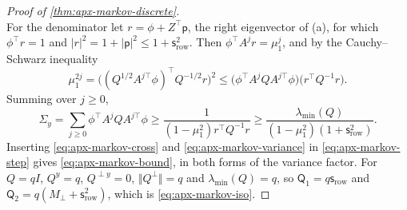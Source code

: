 \begin{proof}[Proof of \cref{thm:apx-markov-discrete}]
\begin{equation}
\end{equation}
For the denominator let $r=\phi+Z^\top\mathsf p$, the right eigenvector of (a), for which $\phi^\top r=1$ and $\lvert r\rvert^2=1+\lvert\mathsf p\rvert^2\le1+\mathsf s_{\mathrm{row}}^2$. Then $\phi^\top A^jr=\mu_1^j$, and by the Cauchy--Schwarz inequality
\begin{equation*}
\mu_1^{2j}=\bigl((Q^{1/2}A^{j\top}\phi)^\top Q^{-1/2}r\bigr)^2\le\bigl(\phi^\top A^jQA^{j\top}\phi\bigr)\bigl(r^\top Q^{-1}r\bigr).
\end{equation*}
Summing over $j\ge0$,
\begin{equation}\label{eq:apx-markov-variance}
\Sigma_y=\sum_{j\ge0}\phi^\top A^jQA^{j\top}\phi\ge\frac1{(1-\mu_1^2)r^\top Q^{-1}r}\ge\frac{\lambda_{\min}(Q)}{(1-\mu_1^2)(1+\mathsf s_{\mathrm{row}}^2)} .
\end{equation}
Inserting \eqref{eq:apx-markov-cross} and \eqref{eq:apx-markov-variance} in \eqref{eq:apx-markov-step} gives \eqref{eq:apx-markov-bound}, in both forms of the variance factor. For $Q=qI$, $Q^y=q$, $Q^{\perp y}=0$, $\Vert Q^\perp\Vert=q$ and $\lambda_{\min}(Q)=q$, so $\mathsf Q_1=q\mathsf s_{\mathrm{row}}$ and $\mathsf Q_2=q(M_\perp+\mathsf s_{\mathrm{row}}^2)$, which is \eqref{eq:apx-markov-iso}.


\end{proof}

